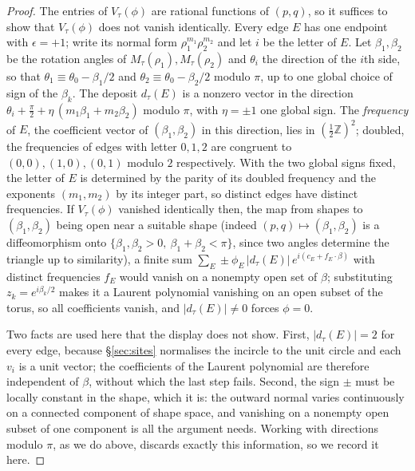 \documentclass[11pt]{article}
\theoremstyle{definition}
\theoremstyle{remark}
\newcommand{\Z}{\mathbb{Z}}
\begin{document}
\begin{proof}
The entries of $V_\tau(\phi)$ are rational functions of $(p,q)$, so it
suffices to show that $V_\tau(\phi)$ does not vanish identically. Every edge
$E$ has one endpoint with $\epsilon=+1$; write its normal form
$\rho_1^{m_1}\rho_2^{m_2}$ and let $i$ be the letter of $E$. Let
$\beta_1,\beta_2$ be the rotation angles of $M_\tau(\rho_1),M_\tau(\rho_2)$
and $\theta_i$ the direction of the $i$th side, so that
$\theta_1\equiv\theta_0-\beta_1/2$ and $\theta_2\equiv\theta_0-\beta_2/2$
modulo $\pi$, up to one global choice of sign of the $\beta_k$. The deposit
$d_\tau(E)$ is a nonzero vector in the direction
$\theta_i+\tfrac\pi2+\eta\,(m_1\beta_1+m_2\beta_2)$ modulo $\pi$, with
$\eta=\pm1$ one global sign. The \emph{frequency} of $E$, the coefficient
vector of $(\beta_1,\beta_2)$ in this direction, lies in
$(\tfrac12\Z)^2$; doubled, the frequencies of edges with letter $0,1,2$ are
congruent to $(0,0),(1,0),(0,1)$ modulo $2$ respectively. With the two global
signs fixed, the letter of $E$ is determined by the parity of its doubled
frequency and the exponents $(m_1,m_2)$ by its integer part, so distinct
edges have distinct frequencies. If $V_\tau(\phi)$ vanished identically then, the map from
shapes to $(\beta_1,\beta_2)$ being open near a suitable shape (indeed
$(p,q)\mapsto(\beta_1,\beta_2)$ is a diffeomorphism onto
$\{\beta_1,\beta_2>0,\ \beta_1+\beta_2<\pi\}$, since two angles determine the
triangle up to similarity), a finite sum
$\sum_E \pm\phi_E\,|d_\tau(E)|\,e^{i(c_E+f_E\cdot\beta)}$ with distinct
frequencies $f_E$ would vanish on a nonempty open set of $\beta$;
substituting $z_k=e^{i\beta_k/2}$ makes it a Laurent polynomial vanishing on
an open subset of the torus, so all coefficients vanish, and
$|d_\tau(E)|\neq0$ forces $\phi=0$.

Two facts are used here that the display does not show. First,
$|d_\tau(E)|=2$ for every edge, because \S\ref{sec:sites} normalises the
incircle to the unit circle and each $v_i$ is a unit vector; the coefficients of
the Laurent polynomial are therefore independent of $\beta$, without which the
last step fails. Second, the sign $\pm$ must be locally constant in the shape,
which it is: the outward normal varies continuously on a connected component of
shape space, and vanishing on a nonempty open subset of one component is all the
argument needs. Working with directions modulo $\pi$, as we do above, discards
exactly this information, so we record it here.
\end{proof}
\end{document}
